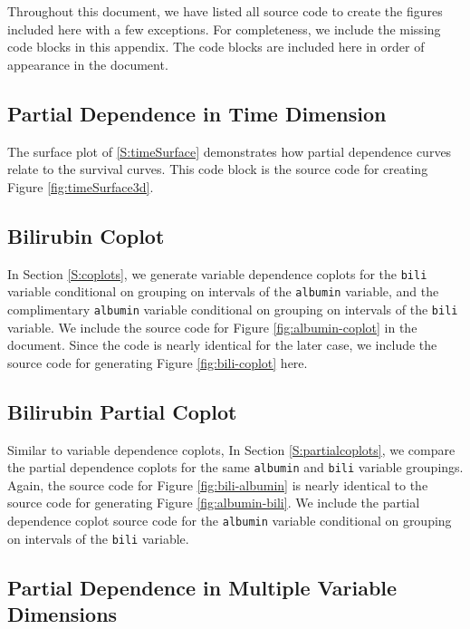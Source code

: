 \documentclass[article]{jss}
\begin{document}
Throughout this document, we have listed all  source code to
create the figures included here with a few exceptions. For
completeness, we include the missing code blocks in this appendix. The
code blocks are included here in order of appearance in the document.

\subsection{Partial Dependence in Time
Dimension}\label{partial-dependence-in-time-dimension}

The surface plot of \ref{S:timeSurface} demonstrates how partial
dependence curves relate to the survival curves. This code block is the
 source code for creating Figure \ref{fig:timeSurface3d}.

\subsection{Bilirubin Coplot}\label{bilirubin-coplot}

In Section \ref{S:coplots}, we generate variable dependence coplots for
the \texttt{bili} variable conditional on grouping on intervals of the
\texttt{albumin} variable, and the complimentary \texttt{albumin}
variable conditional on grouping on intervals of the \texttt{bili}
variable. We include the source code for Figure \ref{fig:albumin-coplot}
in the document. Since the code is nearly identical for the later case,
we include the source code for generating Figure \ref{fig:bili-coplot}
here.

\subsection{Bilirubin Partial Coplot}\label{bilirubin-partial-coplot}

Similar to variable dependence coplots, In Section
\ref{S:partialcoplots}, we compare the partial dependence coplots for
the same \texttt{albumin} and \texttt{bili} variable groupings. Again,
the source code for Figure \ref{fig:bili-albumin} is nearly identical to
the source code for generating Figure \ref{fig:albumin-bili}. We include
the partial dependence coplot source code for the \texttt{albumin}
variable conditional on grouping on intervals of the \texttt{bili}
variable.

\subsection{Partial Dependence in Multiple Variable
Dimensions}\label{partial-dependence-in-multiple-variable-dimensions}
\end{document}
